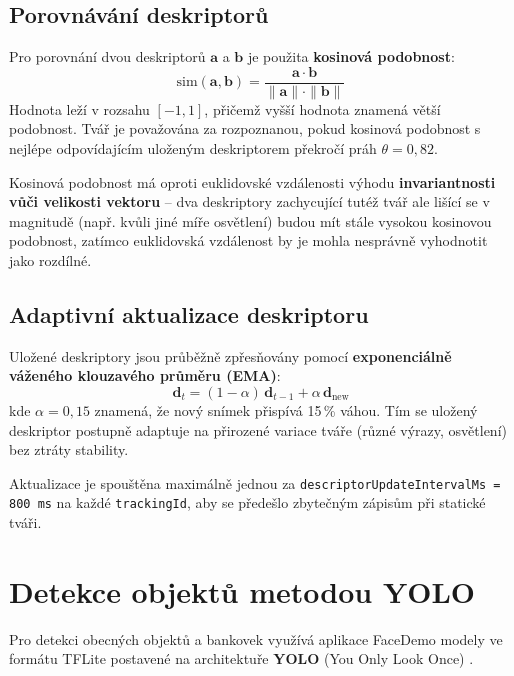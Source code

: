 \documentclass[FM,BP,CZ]{tulthesis}
\begin{document}
\subsection{Porovnávání deskriptorů}
Pro porovnání dvou deskriptorů \( \mathbf{a} \) a \( \mathbf{b} \) je použita \textbf{kosinová podobnost}:
\begin{equation}
    \text{sim}(\mathbf{a}, \mathbf{b}) = \frac{\mathbf{a} \cdot \mathbf{b}}{\|\mathbf{a}\| \cdot \|\mathbf{b}\|}
\end{equation}
Hodnota leží v rozsahu \([-1, 1]\), přičemž vyšší hodnota znamená větší podobnost. Tvář je považována za rozpoznanou, pokud kosinová podobnost s nejlépe odpovídajícím uloženým deskriptorem překročí práh \( \theta = 0{,}82 \).

Kosinová podobnost má oproti euklidovské vzdálenosti výhodu \textbf{invariantnosti vůči velikosti vektoru} \cite{goodfellow2016deeplearning} – dva deskriptory zachycující tutéž tvář ale lišící se v magnitudě (např. kvůli jiné míře osvětlení) budou mít stále vysokou kosinovou podobnost, zatímco euklidovská vzdálenost by je mohla nesprávně vyhodnotit jako rozdílné.

\subsection{Adaptivní aktualizace deskriptoru}
Uložené deskriptory jsou průběžně zpřesňovány pomocí \textbf{exponenciálně váženého klouzavého průměru (EMA)}:
\begin{equation}
    \mathbf{d}_{t} = (1 - \alpha)\,\mathbf{d}_{t-1} + \alpha\,\mathbf{d}_{\text{new}}
\end{equation}
kde \( \alpha = 0{,}15 \) znamená, že nový snímek přispívá 15\,\% váhou. Tím se uložený deskriptor postupně adaptuje na přirozené variace tváře (různé výrazy, osvětlení) bez ztráty stability.

Aktualizace je spouštěna maximálně jednou za \texttt{descriptorUpdateIntervalMs = 800\,ms} na každé \texttt{trackingId}, aby se předešlo zbytečným zápisům při statické tváři.

\section{Detekce objektů metodou YOLO}
Pro detekci obecných objektů a bankovek využívá aplikace FaceDemo modely ve formátu TFLite postavené na architektuře \textbf{YOLO} (You Only Look Once) \cite{redmon2016yolo, redmon2018yolov3}.
\end{document}
